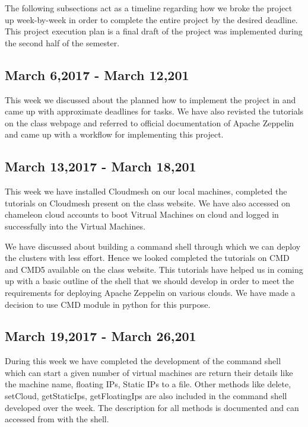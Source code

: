\documentclass[9pt,twocolumn,twoside]{../../styles/osajnl}
\begin{document}
	The following subsections act as a timeline regarding how we 
	broke 
	the project up week-by-week in order to complete the entire 
	project 
	by the desired deadline. This project execution plan is a final 
	draft 
	of the project was implemented during the second half of the 
	semester.
	
	\subsection{March 6,2017 - March 12,201}
	
	This week we discussed about the planned how to implement the 
	project 
	in and came up with approximate deadlines for tasks. We have also 
	revisted the tutorials on the class webpage and referred to 
	official 
	documentation of Apache Zeppelin and came up with a workflow for 
	implementing this project.
	
	\subsection{March 13,2017 - March 18,201}
	
	This week we have installed Cloudmesh on our local machines, 
	completed the tutorials on Cloudmesh present on the class 
	website. We 
	have also accessed on chameleon cloud accounts to boot Vitrual 
	Machines on cloud and logged in successfully into the Virtual 
	Machines.
	
	We have discussed about building a command shell through which 
	we can deploy the clusters with less effort. Hence we looked 
	completed the tutorials on CMD and CMD5 available on the class 
	website. This tutorials have helped us in coming up with a basic 
	outline of the shell that we should develop in order to meet the 
	requirements for deploying Apache Zeppelin on various clouds. We 
	have 
	made a decision to use CMD module in python for this purpose.
	
	\subsection{March 19,2017 - March 26,201}
	
	During this week we have completed the development of the command 
	shell which can start a given number of virtual machines are 
	return 
	their details like the machine name, floating IPs, Static IPs to 
	a 
	file. Other methods like delete, setCloud, getStaticIps, 
	getFloatingIps are also included in the command shell developed 
	over 
	the week.  The description for all methods is documented and can 
	accessed from with the shell.
	
\end{document}
